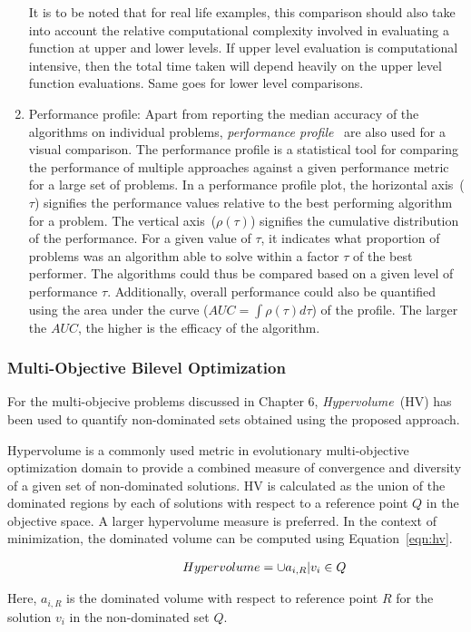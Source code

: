 \begin{enumerate}
It is to be noted that for real life examples, this comparison should also take into account the relative computational complexity involved in evaluating a function at upper and lower levels. If upper level evaluation is computational intensive, then the total time taken will depend heavily on the upper level function evaluations. Same goes for lower level comparisons.

\item Performance profile: Apart from reporting the median accuracy of the algorithms on individual problems, \textit{performance profile}~\cite{dolan2002benchmarking, barbosa2010using} are also used for a visual comparison. The performance profile is a statistical tool for comparing the performance of multiple approaches against a given performance metric for a large set of problems. In a performance profile plot, the horizontal axis~($\tau$) signifies the performance values relative to the best performing algorithm for a problem. The vertical axis~($\rho(\tau)$) signifies the cumulative distribution of the performance. For a given value of $\tau$, it indicates what proportion of problems was an algorithm able to solve within a factor $\tau$ of the best performer. The algorithms could thus be compared based on a given level of performance $\tau$. Additionally, overall performance could also be quantified using the area under the curve ($AUC = \int{\rho(\tau)d\tau}$)  of the profile. The larger the $AUC$, the higher is the efficacy of the algorithm. 
 \end{enumerate}


\subsubsection{Multi-Objective Bilevel Optimization}

For the multi-objecive problems discussed in Chapter 6, \emph{Hypervolume}~(HV) has been used to quantify non-dominated sets obtained using the proposed approach.  



Hypervolume is a commonly used metric in evolutionary multi-objective optimization domain to provide a combined measure of convergence and diversity of a given set of non-dominated solutions. HV is calculated as the union of the dominated regions by each of solutions with respect to a reference point $Q$ in the objective space. A larger hypervolume measure is preferred. In the context of minimization, the dominated volume can be computed using Equation~\ref{eqn:hv}.



\begin{equation}
\begin{array}{lr}
 \hspace{16mm} Hypervolume={\cup a_{i,R}|v_i \in Q}\\
\end{array}
\label{eqn:hv}
\end{equation}

Here, $a_{i,R}$ is the dominated volume with respect to reference point $R$ for the solution $v_i$ in the non-dominated set $Q$.



















